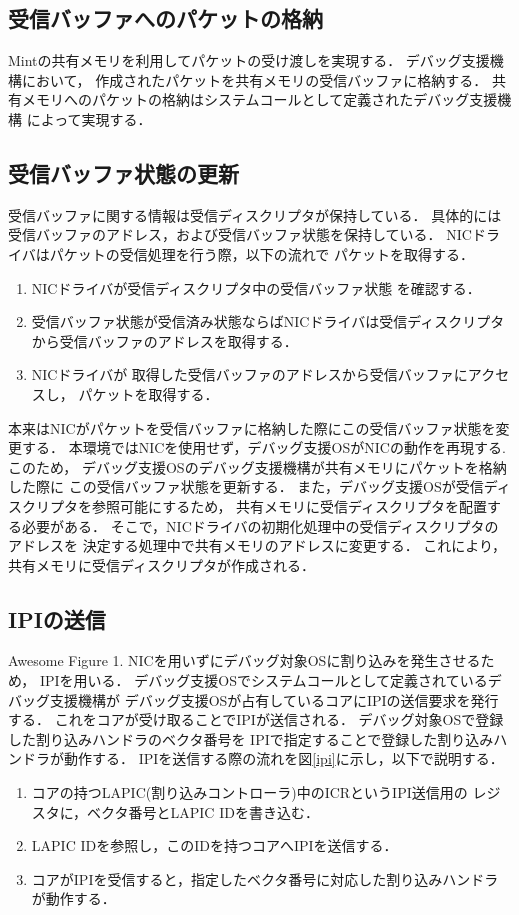\documentclass[tanilab-enum]{graduate}
\begin{document}
\subsection*{受信バッファへのパケットの格納}
Mintの共有メモリを利用してパケットの受け渡しを実現する．
デバッグ支援機構において，
作成されたパケットを共有メモリの受信バッファに格納する．
共有メモリへのパケットの格納はシステムコールとして定義されたデバッグ支援機構
によって実現する．
\subsection*{受信バッファ状態の更新}
受信バッファに関する情報は受信ディスクリプタが保持している．
具体的には受信バッファのアドレス，および受信バッファ状態を保持している．
NICドライバはパケットの受信処理を行う際，以下の流れで
パケットを取得する．
\begin{enumerate}
    \item 
        NICドライバが受信ディスクリプタ中の受信バッファ状態
        を確認する．
    \item
        受信バッファ状態が受信済み状態ならばNICドライバは受信ディスクリプタ
        から受信バッファのアドレスを取得する．
    \item
        NICドライバが
        取得した受信バッファのアドレスから受信バッファにアクセスし，
        パケットを取得する．
\end{enumerate}
本来はNICがパケットを受信バッファに格納した際にこの受信バッファ状態を変更する．
本環境ではNICを使用せず，デバッグ支援OSがNICの動作を再現する.
このため，
デバッグ支援OSのデバッグ支援機構が共有メモリにパケットを格納した際に
この受信バッファ状態を更新する．
また，デバッグ支援OSが受信ディスクリプタを参照可能にするため，
共有メモリに受信ディスクリプタを配置する必要がある．
そこで，NICドライバの初期化処理中の受信ディスクリプタのアドレスを
決定する処理中で共有メモリのアドレスに変更する．
これにより，共有メモリに受信ディスクリプタが作成される．
\subsection*{IPIの送信}
{Awesome Figure 1.}
NICを用いずにデバッグ対象OSに割り込みを発生させるため，
IPIを用いる．
デバッグ支援OSでシステムコールとして定義されているデバッグ支援機構が
デバッグ支援OSが占有しているコアにIPIの送信要求を発行する．
これをコアが受け取ることでIPIが送信される．
デバッグ対象OSで登録した割り込みハンドラのベクタ番号を
IPIで指定することで登録した割り込みハンドラが動作する．
IPIを送信する際の流れを図\ref{ipi}に示し，以下で説明する．
\begin{enumerate}
    \item 
        コアの持つLAPIC(割り込みコントローラ)中のICRというIPI送信用の
        レジスタに，ベクタ番号とLAPIC IDを書き込む．
    \item 
        LAPIC IDを参照し，このIDを持つコアへIPIを送信する．
    \item 
        コアがIPIを受信すると，指定したベクタ番号に対応した割り込みハンドラが動作する．
\end{enumerate}
\end{document}
